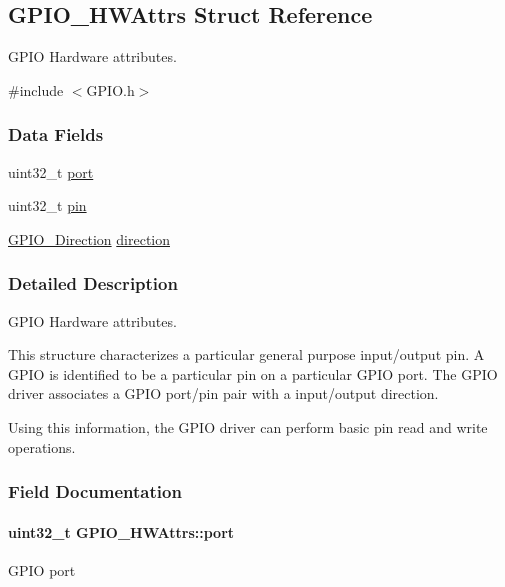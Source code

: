 \subsection{G\-P\-I\-O\-\_\-\-H\-W\-Attrs Struct Reference}
\label{struct_g_p_i_o___h_w_attrs}


G\-P\-I\-O Hardware attributes.  




{\ttfamily \#include $<$G\-P\-I\-O.\-h$>$}

\subsubsection*{Data Fields}
\begin{DoxyCompactItemize}
\item 
uint32\-\_\-t \hyperlink{struct_g_p_i_o___h_w_attrs_a8fee4d0bbcee3dfb5819442b828cf207}{port}
\item 
uint32\-\_\-t \hyperlink{struct_g_p_i_o___h_w_attrs_a09449e8ca5638cff72585a8631cf9286}{pin}
\item 
\hyperlink{_g_p_i_o_8h_a0c1bff6c02d7155b78f07abd8c31722f}{G\-P\-I\-O\-\_\-\-Direction} \hyperlink{struct_g_p_i_o___h_w_attrs_ac48f6d3d51454e458c448f9cead7485e}{direction}
\end{DoxyCompactItemize}


\subsubsection{Detailed Description}
G\-P\-I\-O Hardware attributes. 

This structure characterizes a particular general purpose input/output pin. A G\-P\-I\-O is identified to be a particular pin on a particular G\-P\-I\-O port. The G\-P\-I\-O driver associates a G\-P\-I\-O port/pin pair with a input/output direction.

Using this information, the G\-P\-I\-O driver can perform basic pin read and write operations. 

\subsubsection{Field Documentation}
\paragraph[{port}]{\setlength{\rightskip}{0pt plus 5cm}uint32\-\_\-t G\-P\-I\-O\-\_\-\-H\-W\-Attrs\-::port}\label{struct_g_p_i_o___h_w_attrs_a8fee4d0bbcee3dfb5819442b828cf207}
G\-P\-I\-O port 
